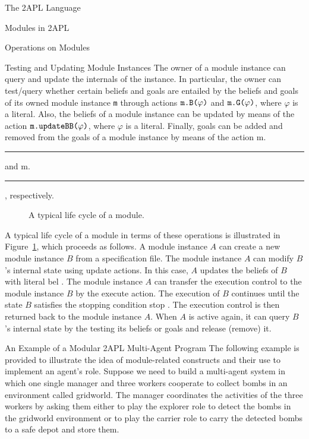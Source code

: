 \begin{chapter}{The 2APL Language}
\begin{section}{Modules in 2APL}
\begin{subsection}{Operations on Modules}
\begin{subsubsection}{Testing and Updating Module Instances}
The owner of a module instance can query and update the internals of
the instance. In particular, the owner can test/query whether
certain beliefs and goals are entailed by the beliefs and goals of
its owned module instance {\tt m} through actions
\(\text{\texttt{m.B(}}\varphi\text{\texttt{)}}\) and \(\text{\texttt{m.G(}}\varphi\text{\texttt{)}}\), where
$\varphi$ is a literal. Also, the beliefs of a module instance
 can be updated by means of the action
\(\text{\texttt{m.updateBB(}}\varphi\text{\texttt{)}}\), where \(\varphi\) is a literal.
Finally, goals can be added and removed from the goals of a module
instance  by means of the action \ttt m.\rule{adoptgoal}\ttt
and \ttt m.\rule{dropgoal}\ttt, respectively.
\end{subsubsection}

\begin{figure}[ht]
    \begin{center}
    \end{center}
    \caption{A typical life cycle of a module.}\label{fig:execution}
\end{figure}

A typical life cycle of a module in terms of these operations is
illustrated in Figure~\ref{fig:execution}, which proceeds as
follows.  A module instance \(A\) can create a new module instance
\(B\) from a specification file. The module instance \(A\) can
modify \(B\)'s internal state using update actions. In this case,
\(A\) updates the beliefs of \(B\) with literal \ttt bel \ttt. The
module instance \(A\) can transfer the execution control to the
module instance \(B\) by the execute action. The execution of \(B\)
continues until the state \(B\) satisfies the stopping condition
\ttt stop \ttt. The execution control is then returned back to the
module instance \(A\). When \(A\) is active again, it can query
\(B\)'s internal state by the testing its beliefs or goals and
release (remove) it.
\end{subsection}


\begin{subsection}{An Example of a Modular 2APL Multi-Agent Program}
The following example is provided to illustrate the idea of
module-related constructs and their use to implement an agent's
role. Suppose we need to build a multi-agent system in which one
single manager and three workers cooperate to collect bombs in an
environment called gridworld. The manager coordinates the activities
of the three workers by asking them either to play the explorer role
to detect the bombs in the gridworld environment or to play the
carrier role to carry the detected bombs to a safe depot and store
them.


\end{subsection}
\end{section}
\end{chapter}
